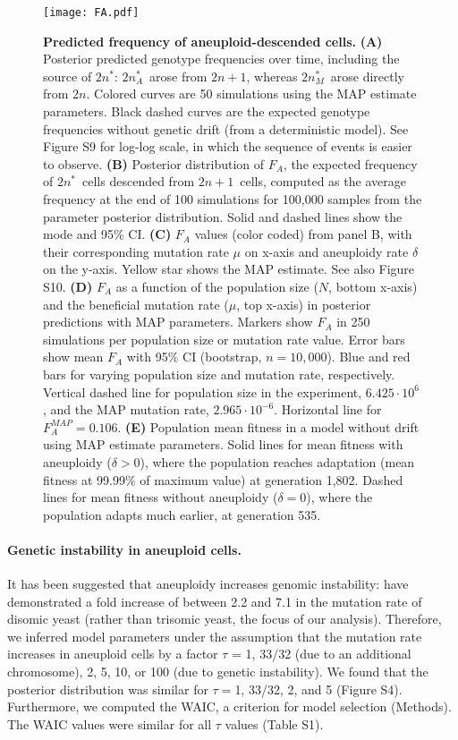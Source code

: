 \documentclass[12pt]{article}
\newcommand{\euwt}{\emph{$2n$}}
\newcommand{\anwt}{\emph{$2n+1$}}
\newcommand{\eumt}{\emph{$2n^*$}}
\newcommand{\eumtM}{\emph{$2n^*_M$}}
\newcommand{\eumtA}{\emph{$2n^*_A$}}
\begin{document}

\begin{figure}[p]
      \centering
      \texttt{[image: FA.pdf]}      
  \caption{
    \textbf{Predicted frequency of aneuploid-descended cells.}     
    \textbf{(A)} Posterior predicted genotype frequencies over time, including the source of \eumt: \eumtA\ arose from \anwt, whereas \eumtM\ arose directly from \euwt. Colored curves are 50 simulations using the MAP estimate parameters. Black dashed curves are the expected genotype frequencies without genetic drift (from a deterministic model). 
     See Figure S9 for log-log scale, in which the sequence of events is easier to observe.
    \textbf{(B)} Posterior distribution of $F_A$, the expected frequency of \eumt\ cells descended from \anwt\ cells, computed as the average frequency at the end of 100 simulations for 100,000 samples from the parameter posterior distribution.
    Solid and dashed lines show the mode and 95\% CI.
	\textbf{(C)} $F_A$ values (color coded) from panel B, with their corresponding mutation rate $\mu$ on x-axis and aneuploidy rate $\delta$ on the y-axis.
	Yellow star shows the MAP estimate. See also Figure S10.
	\textbf{(D)} $F_A$ as a function of the population size ($N$, bottom x-axis) and the beneficial mutation rate ($\mu$, top x-axis) in posterior predictions with MAP parameters. 
	Markers show $F_A$ in 250 simulations per population size or mutation rate value.
	Error bars show mean $F_A$ with 95\% CI (bootstrap, $n=10,000$). Blue and red bars for varying population size and mutation rate, respectively.
	Vertical dashed line for population size in the experiment, $6.425\cdot10^6$, and the MAP mutation rate, $2.965\cdot10^{-6}$. Horizontal line for $F_A^{MAP}=0.106$. 
	\textbf{(E)} Population mean fitness in a model without drift using MAP estimate parameters. Solid lines for mean fitness with aneuploidy ($\delta>0$), where the population reaches adaptation (mean fitness at 99.99\% of maximum value) at generation 1,802. Dashed lines for mean fitness without aneuploidy ($\delta=0$), where the population adapts much earlier, at generation 535.
     }
  \label{fig:FA}
\end{figure}


\paragraph{Genetic instability in aneuploid cells.}
It has been suggested that aneuploidy increases genomic instability: \citet{Sheltzer2011b} have demonstrated a fold increase of between 2.2 and 7.1 in the mutation rate of disomic yeast (rather than trisomic yeast, the focus of our analysis).
Therefore, we inferred model parameters under the assumption that the mutation rate increases in aneuploid cells by a factor $\tau$ = 1, 33/32 (due to an additional chromosome), 2, 5, 10, or 100 (due to genetic instability).
We found that the posterior distribution was similar for $\tau=$1, 33/32, 2, and 5 (Figure S4). Furthermore, we computed the WAIC, a criterion for model selection (Methods). The WAIC values were similar for all $\tau$ values (Table S1).
\end{document}

